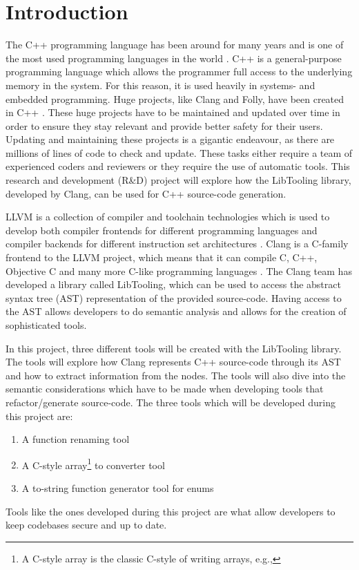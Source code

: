 \chapter{Introduction}

The C++ programming language has been around for many years and is one of the most used programming languages in the world \cite{nexttechnologyprofessionalsMostPopularProgramming2022}.
C++ is a general-purpose programming language which allows the programmer full access to the underlying memory in the system. 
For this reason, it is used heavily in systems- and embedded programming. \cite{adminWhereUsedIndustry2021}
Huge projects, like Clang and Folly, have been created in C++ \cite{clangClangLanguageFamily, facebookFollyFacebookOpensource2023}.
These huge projects have to be maintained and updated over time in order to ensure they stay relevant and provide better safety for their users. 
Updating and maintaining these projects is a gigantic endeavour, as there are millions of lines of code to check and update.
These tasks either require a team of experienced coders and reviewers or they require the use of automatic tools.
This research and development (R\&D) project will explore how the LibTooling library, developed by Clang, can be used for C++ source-code generation.

LLVM is a collection of compiler and toolchain technologies which is used to develop both compiler frontends for different programming languages and compiler backends for different instruction set architectures \cite{llvmLLVMCompilerInfrastructure}.
Clang is a C-family frontend to the LLVM project, which means that it can compile C, C++, Objective C and many more C-like programming languages \cite{clangClangLanguageFamily}.
The Clang team has developed a library called LibTooling, which can be used to access the abstract syntax tree (AST) representation of the provided source-code. 
Having access to the AST allows developers to do semantic analysis and allows for the creation of sophisticated tools.

In this project, three different tools will be created with the LibTooling library. The tools will explore how Clang represents C++ source-code through its AST and how to extract information from the nodes. The tools will also dive into the semantic considerations which have to be made when developing tools that refactor/generate source-code. The three tools which will be developed during this project are:

\begin{enumerate}
    \item A function renaming tool
    \item A C-style array\footnote{A C-style array is the classic C-style of writing arrays, e.g., } to  converter tool
    \item A to-string function generator tool for enums
\end{enumerate}

Tools like the ones developed during this project are what allow developers to keep codebases secure and up to date.